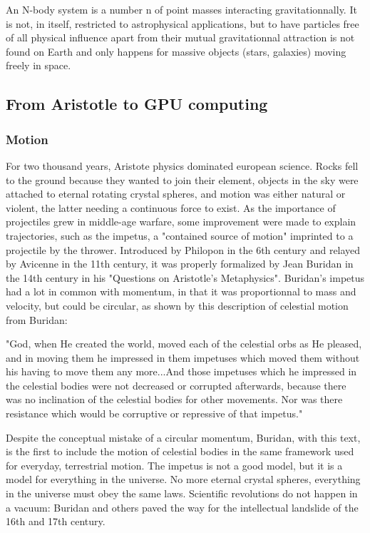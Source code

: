 An N-body system is a number n of point masses interacting gravitationnally. It is not, in itself, restricted to astrophysical applications, but to have particles free of all physical influence apart from their mutual gravitationnal attraction is not found on Earth and only happens for massive objects (stars, galaxies) moving freely in space.


\subsection*{From Aristotle to GPU computing}

\subsubsection*{Motion}
For two thousand years, Aristote physics dominated european science. Rocks fell to the ground because they wanted to join their element, objects in the sky were attached to eternal rotating crystal spheres, and motion was either natural or violent, the latter needing a continuous force to exist. As the importance of projectiles grew in middle-age warfare, some improvement were made to explain trajectories, such as the impetus, a "contained source of motion" imprinted to a projectile by the thrower. Introduced by Philopon in the 6th century and relayed by Avicenne in the 11th century, it was properly formalized by Jean Buridan in the 14th century in his "Questions on Aristotle's Metaphysics". Buridan's impetus had a lot in common with momentum, in that it was proportionnal to mass and velocity, but could be circular, as shown by this description of celestial motion from Buridan:

"God, when He created the world, moved each of the celestial orbs as He pleased, and in moving them he impressed in them impetuses which moved them without his having to move them any more...And those impetuses which he impressed in the celestial bodies were not decreased or corrupted afterwards, because there was no inclination of the celestial bodies for other movements. Nor was there resistance which would be corruptive or repressive of that impetus." \citep{clagett1959}

Despite the conceptual mistake of a circular momentum, Buridan, with this text, is the first to include the motion of celestial bodies in the same framework used for everyday, terrestrial motion. The impetus is not a good model, but it is a model for everything in the universe. No more eternal crystal spheres, everything in the universe must obey the same laws. Scientific revolutions do not happen in a vacuum: Buridan and others paved the way for the intellectual landslide of the 16th and 17th century.

